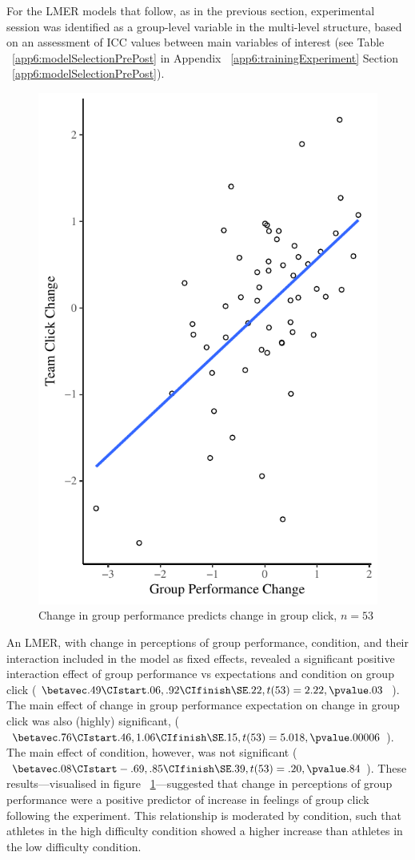 For the LMER models that follow, as in the previous section, experimental session was identified as a group-level variable in the multi-level structure, based on an assessment of ICC values between main variables of interest (see Table ~\ref{app6:modelSelectionPrePost} in Appendix ~\ref{app6:trainingExperiment} Section ~\ref{app6:modelSelectionPrePost}).




\begin{figure}
    \centering
    \includegraphics[width=0.5\linewidth,keepaspectratio] {images/groupPerfClickChangeCondition}
    \caption{Change in group performance predicts change in group click, $n = 53$}
    \label{fig:groupPerfClickChangeCondition}
\end{figure}

An LMER, with change in perceptions of group performance, condition, and their interaction included in the model as fixed effects, revealed a significant positive interaction effect of group performance vs expectations and condition on group click
($\betavec .49 \CIstart .06, .92 \CIfinish \SE .22, t(53) = 2.22, \pvalue .03 $ \MR \CR).  The main effect of change in group performance expectation on change in group click was also (highly) significant, ($\betavec .76 \CIstart .46, 1.06 \CIfinish \SE .15, t(53) = 5.018, \pvalue .00006 $). The main effect of condition, however, was not significant ($\betavec .08 \CIstart -.69, .85 \CIfinish \SE .39, t(53) = .20, \pvalue .84 $).
These results---visualised in figure ~\ref{fig:groupPerfClickChangeCondition}---suggested that change in perceptions of group performance were a positive predictor of increase in feelings of group click following the experiment.  This relationship is moderated by condition, such that athletes in the high difficulty condition showed a higher increase than athletes in the low difficulty condition.

